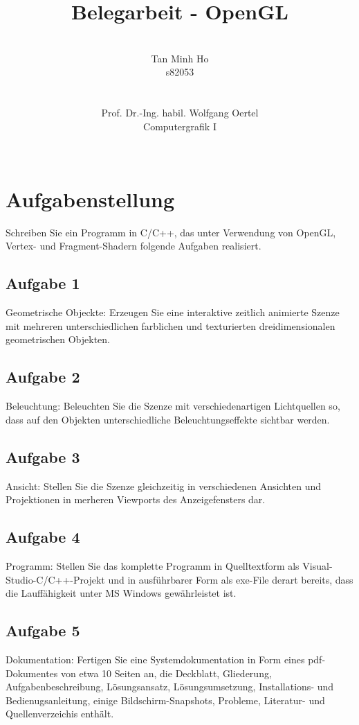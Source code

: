 \documentclass[12pt]{article}
\author{\\ Tan Minh Ho \\ s82053 \\ \\ \\ Prof. Dr.-Ing. habil. Wolfgang Oertel \\ Computergrafik I\\ \\ }
\title{Belegarbeit - OpenGL}
\begin{document}
\maketitle 

\pagebreak

\tableofcontents

\pagebreak

\section{Aufgabenstellung}

Schreiben Sie ein Programm in C/C++, das unter Verwendung von OpenGL, Vertex- und Fragment-Shadern folgende Aufgaben realisiert. \\

\subsection{Aufgabe 1}
Geometrische Objeckte: Erzeugen Sie eine interaktive zeitlich animierte Szenze mit mehreren unterschiedlichen farblichen und texturierten dreidimensionalen geometrischen Objekten. \\
\subsection{Aufgabe 2}
Beleuchtung: Beleuchten Sie die Szenze mit verschiedenartigen Lichtquellen so, dass auf den Objekten unterschiedliche Beleuchtungseffekte sichtbar werden. \\
\subsection{Aufgabe 3}
Ansicht: Stellen Sie die Szenze gleichzeitig in verschiedenen Ansichten und Projektionen in merheren Viewports des Anzeigefensters dar. \\
\subsection{Aufgabe 4}
Programm: Stellen Sie das komplette Programm in Quelltextform als Visual-Studio-C/C++-Projekt und in ausführbarer Form als exe-File derart bereits, dass die Lauffähigkeit unter MS Windows gewährleistet ist.\\
\subsection{Aufgabe 5}
Dokumentation: Fertigen Sie eine Systemdokumentation in Form eines pdf-Dokumentes von etwa 10 Seiten an, die Deckblatt, Gliederung, Aufgabenbeschreibung, Lösungsansatz, Lösungsumsetzung, Installations- und Bedienugsanleitung,
einige Bildschirm-Snapshots, Probleme, Literatur- und Quellenverzeichis enthält. \\
\end{document}
